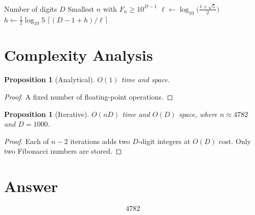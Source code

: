 \documentclass[12pt,a4paper]{article}
\newtheorem{proposition}[theorem]{Proposition}
\theoremstyle{definition}
\begin{document}
\begin{algorithm}[H]
\caption{First Fibonacci Number with $D$ Digits}
\begin{algorithmic}[1]
\REQUIRE Number of digits $D$
\ENSURE Smallest $n$ with $F_n \geq 10^{D-1}$
\STATE $\ell \gets \log_{10}\!\bigl(\frac{1+\sqrt{5}}{2}\bigr)$
\STATE $h \gets \frac{1}{2}\log_{10}5$
\RETURN $\lceil (D - 1 + h) / \ell \rceil$
\end{algorithmic}
\end{algorithm}

\section{Complexity Analysis}

\begin{proposition}[Analytical]
$O(1)$ time and space.
\end{proposition}

\begin{proof}
A fixed number of floating-point operations.
\end{proof}

\begin{proposition}[Iterative]
$O(nD)$ time and $O(D)$ space, where $n \approx 4782$ and $D = 1000$.
\end{proposition}

\begin{proof}
Each of $n - 2$ iterations adds two $D$-digit integers at $O(D)$ cost. Only two Fibonacci numbers are stored.
\end{proof}

\section{Answer}

\[
\boxed{4782}
\]
\end{document}
